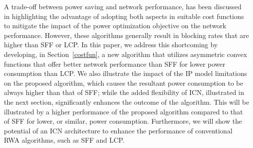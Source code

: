\documentclass[journal]{IEEEtran}
\begin{document}
A trade-off between power saving and network performance, has been discussed in \cite{wia:alloptic, coi:alloptic} highlighting the advantage of adopting both aspects in suitable cost functions to mitigate the impact of the power optimization objective on the network performance. However, these algorithms generally result in blocking rates that are higher than SFF or LCP.
In this paper, we address this shortcoming by developing, in
Section~\ref{costfun}, a new algorithm that utilizes asymmetric
convex functions that offer better network performance than SFF for lower power consumption than LCP. 
We also illustrate the impact of the IP model limitations on the proposed algorithm, which causes the resultant power consumption to be always higher than that of SFF; while the added flexibility of ICN, illustrated in the next section, significantly enhances the outcome of the algorithm. This will be illustrated by a higher performance of the proposed algorithm compared to that of SFF for lower, or similar, power consumption. Furthermore, we will show the potential of an ICN architecture to enhance the performance of conventional RWA algorithms, such as SFF and LCP.
\end{document}
